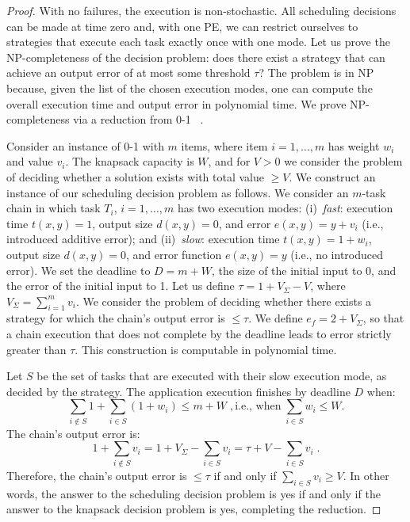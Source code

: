 \begin{proof}
With no failures, the execution is non-stochastic. All scheduling decisions
can be made at time zero and, with one PE, we can restrict ourselves to
strategies that execute each task exactly once with one mode.  Let us
prove the NP-completeness of the decision problem: does there exist a
strategy that can achieve an output error of at most some threshold $\tau$?
The problem is in NP because, given the list of the chosen execution modes,
one can compute the overall execution time and output error in polynomial
time.  We prove NP-completeness via a reduction from 0-1
\knapsack~\cite{GareyJ79}.

Consider an instance of 0-1 \knapsack with $m$ items, where item
$i{=}1,\ldots,m$ has weight $w_i$ and value $v_i$. The knapsack capacity is
$W$, and for $V{>}0$ we consider the problem of deciding whether a solution
exists with total value ${\geq}V$.  We construct an instance
of our scheduling decision problem as follows. We consider an $m$-task
chain in which task $T_i$, $i{=}1,\ldots,m$ has two execution modes:
(i)~\emph{fast}: execution time $t(x,y){=}1$, output size $d(x,y){=}0$, 
and error $e(x,y){=}y{+}v_i$ (i.e., introduced additive error); and (ii)~\emph{slow}: execution
	time $t(x,y){=}1{+}w_i$, output size $d(x,y){=}0$, and error
function $e(x,y){=}y$ (i.e., no introduced error).
We set the deadline to $D{=}m{+}W$, the size of the initial input to 0,
and the error of the initial input to 1. 
Let us define $\tau{=}1{+}V_{\Sigma}{-}V$, where
$V_{\Sigma}{=}\sum_{i=1}^m v_i$.  We consider the problem of deciding whether
there exists a strategy for which the chain's output error is
${\leq}\tau$.  We define $e_f{=}2{+}V_{\Sigma}$, so that a chain execution
that does not complete by the deadline leads to error strictly greater than
$\tau$.  This construction is computable in polynomial time.

Let $S$ be the set of tasks that are executed with their slow execution
mode, as decided by the strategy. 
The application execution finishes by deadline $D$ when:
$$
\sum_{i \notin S} 1 + \sum_{i \in S} (1 + w_i) \leq m + W\;,
\text{i.e., when}
\;\sum_{i \in S} w_i \leq W .
$$
The chain's output error is:
$$
1 + \sum_{i \notin S} v_i = 1 + V_{\Sigma} - \sum_{i \in S} v_i = \tau + V - \sum_{i \in S} v_i \;.
$$
Therefore, the chain's output error is ${\leq}\tau$ if and only if $\sum_{i
\in S} v_i{\geq}V$.  In other words, the answer to the scheduling decision
problem is yes if and only if the answer to the knapsack decision problem is yes,
completing the reduction.
\end{proof}



